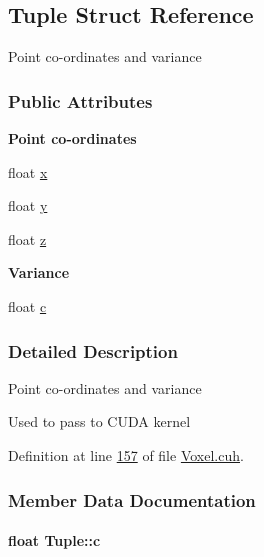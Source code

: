 \hypertarget{structTuple}{}\subsection{Tuple Struct Reference}
\label{structTuple}


Point co-\/ordinates and variance  


\subsubsection*{Public Attributes}
\begin{Indent}{\bf Point co-\/ordinates}\par
\begin{DoxyCompactItemize}
\item 
float \hyperlink{structTuple_a9355c336c18afa6b76685ddffe16c5a5}{x}
\item 
float \hyperlink{structTuple_ae298b0277eb33e02696b6e3716e93c46}{y}
\item 
float \hyperlink{structTuple_a5f83aeb6b110bc956fd27b8e713a9ad5}{z}
\end{DoxyCompactItemize}
\end{Indent}
\begin{Indent}{\bf Variance}\par
\begin{DoxyCompactItemize}
\item 
float \hyperlink{structTuple_a69871fb52122a48baa140565fb1b7c0c}{c}
\end{DoxyCompactItemize}
\end{Indent}


\subsubsection{Detailed Description}
Point co-\/ordinates and variance 

Used to pass to C\+U\+DA kernel 

Definition at line \hyperlink{Voxel_8cuh_source_l00157}{157} of file \hyperlink{Voxel_8cuh_source}{Voxel.\+cuh}.



\subsubsection{Member Data Documentation}
\paragraph[{\texorpdfstring{c}{c}}]{\setlength{\rightskip}{0pt plus 5cm}float Tuple\+::c}\hypertarget{structTuple_a69871fb52122a48baa140565fb1b7c0c}{}\label{structTuple_a69871fb52122a48baa140565fb1b7c0c}


